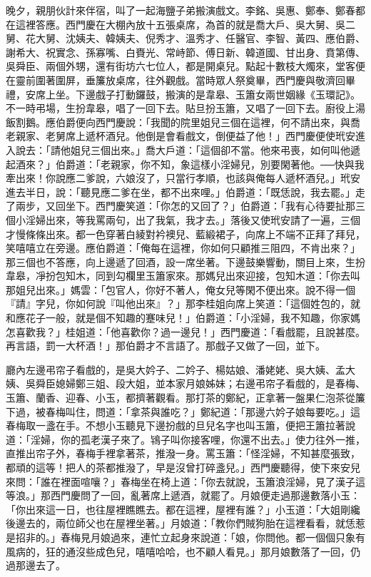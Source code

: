 晚夕，親朋伙計來伴宿，叫了一起海鹽子弟搬演戲文。李銘、吳惠、鄭奉、鄭春都在這裡答應。西門慶在大棚內放十五張桌席，為首的就是喬大戶、吳大舅、吳二舅、花大舅、沈姨夫、韓姨夫、倪秀才、溫秀才、任醫官、李智、黃四、應伯爵、謝希大、祝實念、孫寡嘴、白賚光、常峙節、傅日新、韓道國、甘出身、賁第傳、吳舜臣、兩個外甥，還有街坊六七位人，都是開桌兒。點起十數枝大燭來，堂客便在靈前圍著圍屏，垂簾放桌席，往外觀戲。當時眾人祭奠畢，西門慶與敬濟回畢禮，安席上坐。下邊戲子打動鑼鼓，搬演的是韋皋、玉簫女兩世姻緣《玉環記》。不一時弔場，生扮韋皋，唱了一回下去。貼旦扮玉簫，又唱了一回下去。廚役上湯飯割鵝。應伯爵便向西門慶說：「我聞的院里姐兒三個在這裡，何不請出來，與喬老親家、老舅席上遞杯酒兒。他倒是會看戲文，倒便益了他！」西門慶便使玳安進入說去：「請他姐兒三個出來。」喬大戶道：「這個卻不當。他來弔喪，如何叫他遞起酒來？」伯爵道：「老親家，你不知，象這樣小淫婦兒，別要閑著他。──快與我牽出來！你說應二爹說，六娘沒了，只當行孝順，也該與俺每人遞杯酒兒。」玳安進去半日，說：「聽見應二爹在坐，都不出來哩。」伯爵道：「既恁說，我去罷。」走了兩步，又回坐下。西門慶笑道：「你怎的又回了？」伯爵道：「我有心待要扯那三個小淫婦出來，等我罵兩句，出了我氣，我才去。」落後又使玳安請了一遍，三個才慢條條出來。都一色穿著白綾對衿襖兒、藍緞裙子，向席上不端不正拜了拜兒，笑嘻嘻立在旁邊。應伯爵道：「俺每在這裡，你如何只顧推三阻四，不肯出來？」那三個也不答應，向上邊遞了回酒，設一席坐著。下邊鼓樂響動，關目上來，生扮韋皋，凈扮包知木，同到勾欄里玉簫家來。那媽兒出來迎接，包知木道：「你去叫那姐兒出來。」媽雲：「包官人，你好不著人，俺女兒等閑不便出來。說不得一個『請』字兒，你如何說『叫他出來』？」那李桂姐向席上笑道：「這個姓包的，就和應花子一般，就是個不知趣的蹇味兒！」伯爵道：「小淫婦，我不知趣，你家媽怎喜歡我？」桂姐道：「他喜歡你？過一邊兒！」西門慶道：「看戲罷，且說甚麼。再言語，罰一大杯酒！」那伯爵才不言語了。那戲子又做了一回，並下。

廳內左邊弔帘子看戲的，是吳大妗子、二妗子、楊姑娘、潘姥姥、吳大姨、孟大姨、吳舜臣媳婦鄭三姐、段大姐，並本家月娘姊妹；右邊弔帘子看戲的，是春梅、玉簫、蘭香、迎春、小玉，都擠著觀看。那打茶的鄭紀，正拿著一盤果仁泡茶從簾下過，被春梅叫住，問道：「拿茶與誰吃？」鄭紀道：「那邊六妗子娘每要吃。」這春梅取一盞在手。不想小玉聽見下邊扮戲的旦兒名字也叫玉簫，便把王簫拉著說道：「淫婦，你的孤老漢子來了。鴇子叫你接客哩，你還不出去。」使力往外一推，直推出帘子外，春梅手裡拿著茶，推潑一身。罵玉簫：「怪淫婦，不知甚麼張致，都頑的這等！把人的茶都推潑了，早是沒曾打碎盞兒。」西門慶聽得，使下來安兒來問：「誰在裡面喧嚷？」春梅坐在椅上道：「你去就說，玉簫浪淫婦，見了漢子這等浪。」那西門慶問了一回，亂著席上遞酒，就罷了。月娘便走過那邊數落小玉：「你出來這一日，也往屋裡瞧瞧去。都在這裡，屋裡有誰？」小玉道：「大姐剛纔後邊去的，兩位師父也在屋裡坐著。」月娘道：「教你們賊狗胎在這裡看看，就恁惹是招非的。」春梅見月娘過來，連忙立起身來說道：「娘，你問他。都一個個只象有風病的，狂的通沒些成色兒，嘻嘻哈哈，也不顧人看見。」那月娘數落了一回，仍過那邊去了。

